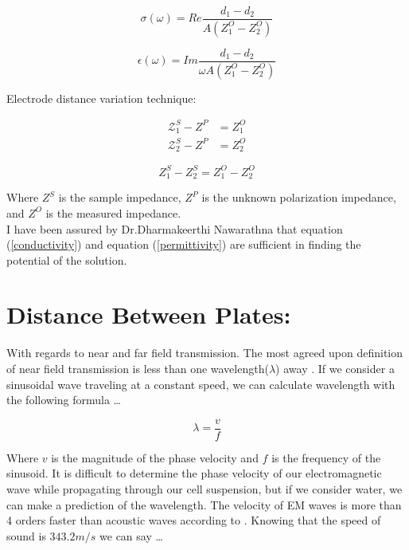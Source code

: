 \documentclass[journal]{IEEEtran}
\begin{document}
\begin{equation}
\label{conductivity}
\sigma(\omega) = Re\frac{d_1-d_2}{A(Z_1^O-Z_2^O)}
\end{equation}

\begin{equation}
\label{permittivity}
\epsilon(\omega) = Im\frac{d_1-d_2}{\omega A(Z_1^O-Z_2^O)}
\end{equation}

Electrode distance variation technique:

\begin{equation}
\begin{aligned}
\label{variation technique derivation}
\mathcal Z_1^S-Z^P &= Z_1^O \\
\mathcal Z_2^S-Z^P &= Z_2^O
\end{aligned}
\end{equation}

\begin{equation}
\label{variation technique}
Z_1^S-Z_2^S = Z_1^O - Z_2^O
\end{equation}

Where $Z^S$ is the sample impedance, $Z^P$ is the unknown polarization impedance, and $Z^O$ is the measured impedance. \\

I have been assured by Dr.Dharmakeerthi Nawarathna that equation (\ref{conductivity}) and equation (\ref{permittivity}) are sufficient in finding the potential of the solution.

\section{Distance Between Plates:}
With regards to near and far field transmission. The most agreed upon definition of near field transmission is less than one wavelength($\lambda$) away \cite{near-far-em}. If we consider a sinusoidal wave traveling at a constant speed, we can calculate wavelength with the following formula \ldots

\begin{equation}
\label{wavelength}
\lambda = \frac{v}{f}
\end{equation}

Where $v$ is the magnitude of the phase velocity and $f$ is the frequency of the sinusoid. It is difficult to determine the phase velocity of our electromagnetic wave while propagating through our cell suspension, but if we consider water, we can make a prediction of the wavelength. The velocity of EM waves is more than 4 orders faster than acoustic waves according to \cite{wave-propagation-water}. Knowing that the speed of sound is $343.2 m/s$ we can say \ldots
\end{document}

